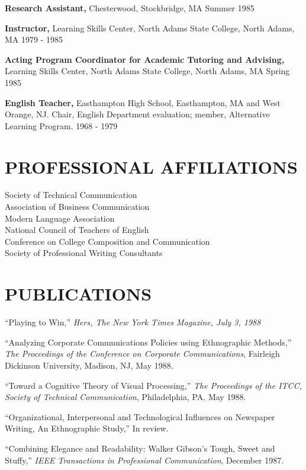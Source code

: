 \documentclass{res}
\begin{document}
\begin{resume}
    {\bf Research Assistant,} Chesterwood, Stockbridge, MA  Summer 1985 
 
    {\bf Instructor,} Learning Skills Center, North Adams State 
    College, North Adams, MA  1979 - 1985 
 
    {\bf Acting Program Coordinator for Academic Tutoring and 
    Advising,} Learning Skills Center, North Adams State College, 
    North Adams, MA  Spring 1985 
 
    {\bf English Teacher,} Easthampton High School, Easthampton, MA and 
    West Orange, NJ.  Chair, English Department evaluation; 
    member, Alternative Learning Program.  1968 - 1979 
 
 
\section{PROFESSIONAL AFFILIATIONS} 
\vspace{0.1in} 
    Society of Technical Communication \\
    Association of Business Communication \\
    Modern Language Association \\
    National Council of Teachers of English \\
    Conference on College Composition and Communication \\
    Society of Professional Writing Consultants 

\section{PUBLICATIONS} 
\vspace{0.1in}
``Playing to Win,'' {\it Hers, The New York Times Magazine, July 3, 1988} 

 
``Analyzing Corporate Communications Policies using Ethnographic 
Methods,'' {\it The Proceedings of the Conference on Corporate 
Communications}, Fairleigh Dickinson University, Madison, NJ, May 
1988. 
 
``Toward a Cognitive Theory of Visual Processing,'' {\it The Proceedings 
of the ITCC, Society of Technical Communication}, Philadelphia, 
PA, May 1988. 
 
``Organizational, Interpersonal and Technological Influences on 
Newspaper Writing, An Ethnographic Study,'' In review. 
 
``Combining Elegance and Readability: Walker Gibson's Tough, Sweet 
and Stuffy,'' {\it IEEE Transactions in Professional Communication}, 
December 1987. 
 

\end{resume}
\end{document}
